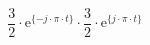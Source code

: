 \[
 \frac{3}{2}\cdot\textrm{e}^{\{-j \cdot \pi \cdot t \}}
\cdot
 \frac{3}{2}\cdot\textrm{e}^{\{ j \cdot \pi \cdot t \}}
\]
